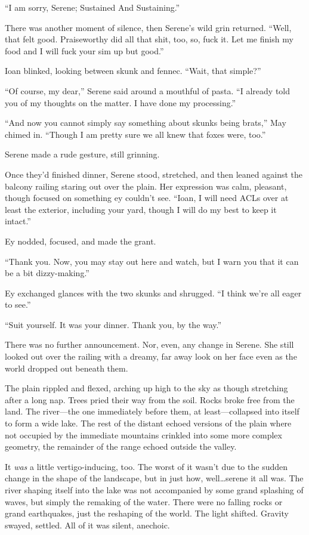 ``I am sorry, Serene; Sustained And Sustaining.''

There was another moment of silence, then Serene's wild grin returned. ``Well, that felt good. Praiseworthy did all that shit, too, so, fuck it. Let me finish my food and I will fuck your sim up but good.''

Ioan blinked, looking between skunk and fennec. ``Wait, that simple?''

``Of course, my dear,'' Serene said around a mouthful of pasta. ``I already told you of my thoughts on the matter. I have done my processing.''

``And now you cannot simply say something about skunks being brats,'' May chimed in. ``Though I am pretty sure we all knew that foxes were, too.''

Serene made a rude gesture, still grinning.

Once they'd finished dinner, Serene stood, stretched, and then leaned against the balcony railing staring out over the plain. Her expression was calm, pleasant, though focused on something ey couldn't see. ``Ioan, I will need ACLs over at least the exterior, including your yard, though I will do my best to keep it intact.''

Ey nodded, focused, and made the grant.

``Thank you. Now, you may stay out here and watch, but I warn you that it can be a bit dizzy-making.''

Ey exchanged glances with the two skunks and shrugged. ``I think we're all eager to see.''

``Suit yourself. It was your dinner. Thank you, by the way.''

There was no further announcement. Nor, even, any change in Serene. She still looked out over the railing with a dreamy, far away look on her face even as the world dropped out beneath them.

The plain rippled and flexed, arching up high to the sky as though stretching after a long nap. Trees pried their way from the soil. Rocks broke free from the land. The river—the one immediately before them, at least—collapsed into itself to form a wide lake. The rest of the distant echoed versions of the plain where not occupied by the immediate mountains crinkled into some more complex geometry, the remainder of the range echoed outside the valley.

It \emph{was} a little vertigo-inducing, too. The worst of it wasn't due to the sudden change in the shape of the landscape, but in just how, well\ldots serene it all was. The river shaping itself into the lake was not accompanied by some grand splashing of waves, but simply the remaking of the water. There were no falling rocks or grand earthquakes, just the reshaping of the world. The light shifted. Gravity swayed, settled. All of it was silent, anechoic.

